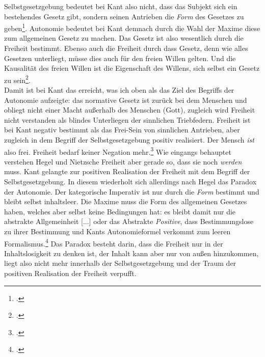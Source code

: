 \documentclass[12pt, a4paper, openany]{report}
\begin{document}
Selbstgesetzgebung bedeutet bei Kant also nicht, dass das Subjekt sich ein bestehendes Gesetz gibt, sondern \glqq seinen Antrieben die \textit{Form} des Gesetzes zu geben\grqq\footcite[][24]{menke_autonomie_2018}.
Autonomie bedeutet bei Kant demnach durch die Wahl der Maxime diese zum allgemeinen Gesetz zu machen. 
Das Gesetz ist also wesentlich durch die Freiheit bestimmt.
Ebenso auch die Freiheit durch dass Gesetz, denn wie alles Gesetzen unterliegt, müsse dies auch für den freien Willen gelten.
Und die Kausalität des freien Willen ist \glqq die Eigenschaft des Willens, sich selbst ein Gesetz zu sein\grqq\footcite[][81]{kant_kritik_2014}.\\

Damit ist bei Kant das erreicht, was ich oben als das Ziel des Begriffs der Autonomie aufzeigte: 
das normative Gesetz ist zurück bei dem Menschen und obliegt nicht einer Macht außerhalb des Menschen (Gott), zugleich wird Freiheit nicht verstanden als blindes Unterliegen der sinnlichen Triebfedern. 
Freiheit ist bei Kant negativ bestimmt als das Frei-Sein von sinnlichen Antrieben, aber zugleich in dem Begriff der Selbstgesetzgebung positiv realisiert. 
Der Mensch \textit{ist} also frei. 
Freiheit bedarf keiner Negation mehr.\footcite[Vgl.][53]{menke_autonomie_2018}
Wie eingangs behauptet verstehen Hegel und Nietzsche Freiheit aber gerade so, dass sie noch \emph{werden} muss. 
Kant gelangte zur positiven Realisation der Freiheit mit dem Begriff der Selbstgesetzgebung. 
In diesem wiederholt sich allerdings nach Hegel das Paradox der Autonomie. Der kategorische Imperativ ist nur durch die \textit{Form} bestimmt und bleibt selbst inhaltsleer.
Die Maxime muss die Form des allgemeinen Gesetzes haben, welches aber selbst keine Bedingungen hat:
es \glqq bleibt damit nur die abstrakte Allgemeinheit [...] oder das Abstrakte \textit{Positive}, dass Bestimmungslose zu ihrer Bestimmung\grqq{} und Kants Autonomieformel verkommt zum \glqq leeren Formalismus\grqq.\footcite[][§135, S. 139.]{hegel_grundlinien_2017}
Das Paradox besteht darin, dass die Freiheit nur in der Inhaltslosigkeit zu denken ist, der Inhalt kann aber nur von außen hinzukommen, liegt also nicht mehr innerhalb der Selbstgesetzgebung und der Traum der positiven Realisation der Freiheit verpufft.
\end{document}
